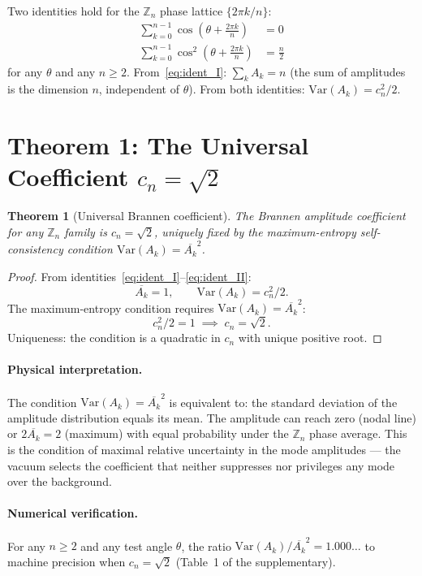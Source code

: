 \documentclass[11pt]{article}
\newtheorem{theorem}{Theorem}
\begin{document}
Two identities hold for the $\mathbb{Z}_n$ phase lattice $\{2\pi k/n\}$:
\begin{align}
  \sum_{k=0}^{n-1} \cos\!\left(\theta + \frac{2\pi k}{n}\right) &= 0
  \label{eq:ident_I} \\
  \sum_{k=0}^{n-1} \cos^2\!\left(\theta + \frac{2\pi k}{n}\right) &= \frac{n}{2}
  \label{eq:ident_II}
\end{align}
for any $\theta$ and any $n \geq 2$.
From~\eqref{eq:ident_I}: $\sum_k A_k = n$ (the sum of amplitudes is the
dimension $n$, independent of $\theta$).
From both identities: $\text{Var}(A_k) = c_n^2/2$.


\section{Theorem 1: The Universal Coefficient $c_n = \sqrt{2}$}
\label{sec:cn}

\begin{theorem}[Universal Brannen coefficient]
  \label{thm:cn}
  The Brannen amplitude coefficient for any $\mathbb{Z}_n$ family is
  $c_n = \sqrt{2}$, uniquely fixed by the maximum-entropy self-consistency
  condition $\mathrm{Var}(A_k) = \overline{A_k}^2$.
\end{theorem}

\begin{proof}
From identities~\eqref{eq:ident_I}--\eqref{eq:ident_II}:
\[
  \overline{A_k} = 1, \qquad \mathrm{Var}(A_k) = c_n^2/2.
\]
The maximum-entropy condition requires $\mathrm{Var}(A_k) = \overline{A_k}^2$:
\[
  c_n^2/2 = 1 \;\implies\; c_n = \sqrt{2}.
\]
Uniqueness: the condition is a quadratic in $c_n$ with unique positive root.
\end{proof}

\paragraph{Physical interpretation.}
The condition $\text{Var}(A_k) = \overline{A_k}^2$ is equivalent to:
the standard deviation of the amplitude distribution equals its mean.
The amplitude can reach zero (nodal line) or $2\overline{A_k} = 2$
(maximum) with equal probability under the $\mathbb{Z}_n$ phase average.
This is the condition of maximal relative uncertainty in the mode
amplitudes --- the vacuum selects the coefficient that neither suppresses
nor privileges any mode over the background.

\paragraph{Numerical verification.}
For any $n \geq 2$ and any test angle $\theta$, the ratio
$\text{Var}(A_k)/\overline{A_k}^2 = 1.000\ldots$ to machine precision
when $c_n = \sqrt{2}$ (Table~1 of the supplementary).
\end{document}
